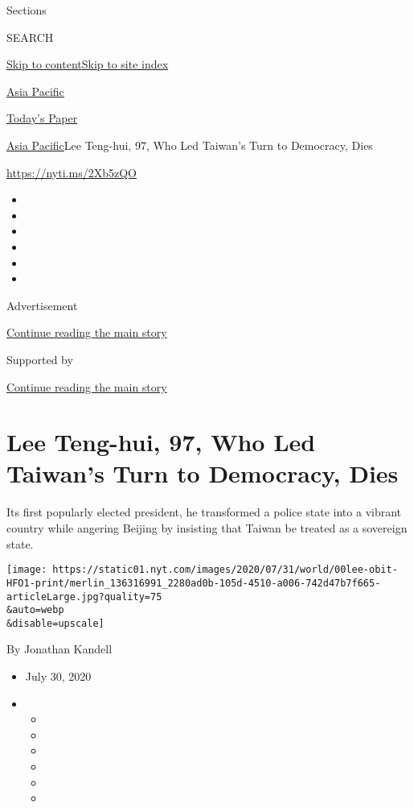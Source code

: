 Sections

SEARCH

\protect\hyperlink{site-content}{Skip to
content}\protect\hyperlink{site-index}{Skip to site index}

\href{https://www.nytimes.com/section/world/asia}{Asia Pacific}

\href{https://myaccount.nytimes.com/auth/login?response_type=cookie\&client_id=vi}{}

\href{https://www.nytimes.com/section/todayspaper}{Today's Paper}

\href{/section/world/asia}{Asia Pacific}\textbar{}Lee Teng-hui, 97, Who
Led Taiwan's Turn to Democracy, Dies

\url{https://nyti.ms/2Xb5zQO}

\begin{itemize}
\item
\item
\item
\item
\item
\item
\end{itemize}

Advertisement

\protect\hyperlink{after-top}{Continue reading the main story}

Supported by

\protect\hyperlink{after-sponsor}{Continue reading the main story}

\hypertarget{lee-teng-hui-97-who-led-taiwans-turn-to-democracy-dies}{%
\section{Lee Teng-hui, 97, Who Led Taiwan's Turn to Democracy,
Dies}\label{lee-teng-hui-97-who-led-taiwans-turn-to-democracy-dies}}

Its first popularly elected president, he transformed a police state
into a vibrant country while angering Beijing by insisting that Taiwan
be treated as a sovereign state.

\texttt{[image: https://static01.nyt.com/images/2020/07/31/world/00lee-obit-HFO1-print/merlin\_136316991\_2280ad0b-105d-4510-a006-742d47b7f665-articleLarge.jpg?quality=75\\\&auto=webp\\\&disable=upscale]}

By Jonathan Kandell

\begin{itemize}
\item
  July 30, 2020
\item
  \begin{itemize}
  \item
  \item
  \item
  \item
  \item
  \item
  \end{itemize}
\end{itemize}

